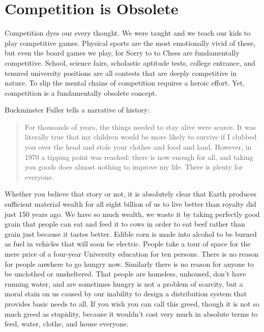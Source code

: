 \documentclass[
	fontsize=10pt, %
	twoside=false, %
	secnumdepth=1, %
]{kaobook}
\begin{document}
\section{Competition is Obsolete}

Competition dyes our every thought.
We were taught and we teach our kids to
play competitive games. Physical sports
are the most emotionally vivid of these,
but even the board games we play, for Sorry to
 to Chess are fundamentally
competitive.
School, science fairs, scholastic aptitude tests,
college entrance, and tenured university positions are
all contests that are deeply competitive in nature.
To slip the mental chains of competition
requires a heroic effort.
Yet, competition is
a fundamentally obsolete concept.

Buckminster Fuller tells a narrative of history:
\blockquote{
For thousands of years, the things
needed to stay alive were scarce. It was literally
true that my children would be more likely to survive
if I clubbed you over the head and stole your clothes
and food and land. However, in 1970 a tipping point
was reached: there is now enough for all, and taking
you goods does almost nothing to improve my life.
There is plenty for everyone.
}

Whether you believe that story or not, it is absolutely
clear that Earth produces sufficient material wealth
for all eight billion of us to live better than royalty
did just 150 years ago. We have so much wealth, we
waste it by taking perfectly good grain that people
can eat and feed it to cows in order to eat beef
rather than grain just because it tastes better.
Edible corn is made into alcohol to be burned as fuel
in vehicles that will soon be electric.
People take a tour of space for the mere price
of a four-year University education for ten persons.
There is no reason for people anwhere to go hungry now.
Similarly there is no reason for anyone to be unclothed
or unsheltered. That people are homeless, unhoused,
don't have running water, and are sometimes hungry
is not a problem of scarcity, but a moral stain
on us caused by our inability to design a distribution
system that provides basic needs to all. If you wish
you can call this greed, though it is not
so much greed as stupidity, because
it wouldn't cost very much in absolute terms to feed, water,
clothe, and house everyone.
\end{document}
